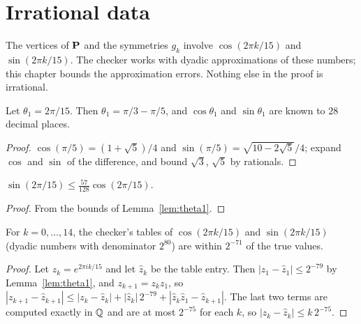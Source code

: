 \chapter{Irrational data}
\label{chap:data}

The vertices of $\operatorname{\mathbf{P}}$ and the symmetries $g_k$ involve $\cos(2\pi k/15)$ and
$\sin(2\pi k/15)$. The checker works with dyadic approximations of these numbers; this
chapter bounds the approximation errors. Nothing else in the proof is irrational.

\begin{lemma}
\label{lem:theta1}
\leanok
Let $\theta_1 = 2\pi/15$. Then $\theta_1 = \pi/3 - \pi/5$, and $\cos\theta_1$ and
$\sin\theta_1$ are known to $28$ decimal places.
\end{lemma}
\begin{proof}
\leanok
$\cos(\pi/5) = (1 + \sqrt5)/4$ and $\sin(\pi/5) = \sqrt{10 - 2\sqrt5}/4$; expand
$\cos$ and $\sin$ of the difference, and bound $\sqrt3$, $\sqrt5$ by rationals.
\end{proof}

\begin{lemma}
\label{lem:sin_wedge}
\leanok
{}
$\sin(2\pi/15) \le \frac{57}{128} \cos(2\pi/15)$.
\end{lemma}
\begin{proof}
\leanok
From the bounds of Lemma~\ref{lem:theta1}.
\end{proof}

\begin{lemma}
\label{lem:trig_table}
\leanok
{}
For $k = 0, \dots, 14$, the checker's tables of $\cos(2\pi k/15)$ and
$\sin(2\pi k/15)$ (dyadic numbers with denominator $2^{80}$) are within $2^{-71}$ of the
true values.
\end{lemma}
\begin{proof}
\leanok
Let $z_k = e^{2\pi i k/15}$ and let $\hat z_k$ be the table entry. Then
$|z_1 - \hat z_1| \le 2^{-79}$ by Lemma~\ref{lem:theta1}, and
$z_{k+1} = z_k z_1$, so
$|z_{k+1} - \hat z_{k+1}| \le |z_k - \hat z_k| + |\hat z_k|\, 2^{-79} + |\hat z_k \hat z_1 - \hat z_{k+1}|$.
The last two terms are computed exactly in $\operatorname{\mathbb{Q}}$ and are at most $2^{-75}$ for each $k$,
so $|z_k - \hat z_k| \le k\, 2^{-75}$.
\end{proof}

